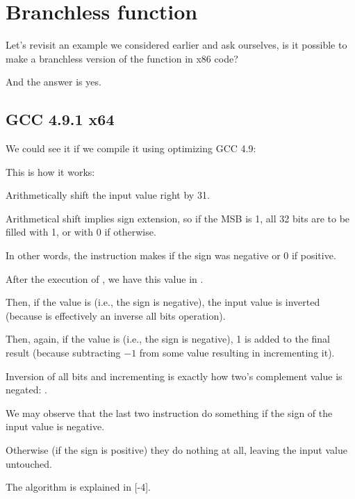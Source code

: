\section{Branchless  function}
\label{chap:branchless_abs}

Let's revisit an example we considered earlier  and ask ourselves, is it possible
to make a branchless version of the function in x86 code?



And the answer is yes.

\subsection{\Optimizing GCC 4.9.1 x64}

We could see it if we compile it using optimizing GCC 4.9:



This is how it works:

Arithmetically shift the input value right by 31.

Arithmetical shift implies sign extension, so if the \ac{MSB} is 1, 
all 32 bits are to be filled with 1, or with 0 if otherwise.

In other words, the  instruction makes  if the sign was negative or 0 if positive.

After the execution of , we have this value in \EDX.

Then, if the value is  (i.e., the sign is negative), the input value is inverted 
(because  is effectively an inverse all bits operation).

Then, again, if the value is  (i.e., the sign is negative), 1 is added to the final result (because
subtracting $-1$ from some value resulting in incrementing it).

Inversion of all bits and incrementing is exactly how two's complement value is negated: 
.

We may observe that the last two instruction do something if the sign of the input value is negative.

Otherwise (if the sign is positive) they do nothing at all, leaving the input value untouched.

The algorithm is explained in [-4].

